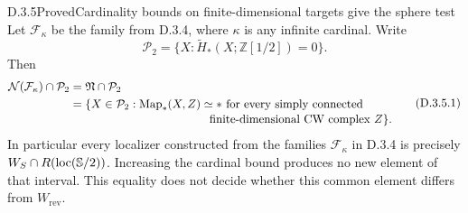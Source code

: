 \begin{claim}{D.3.5}{Proved}{Cardinality bounds on finite-dimensional targets give the sphere test}
Let $\mathcal F_\kappa$ be the family from D.3.4, where
$\kappa$ is any infinite cardinal. Write
\[
 \mathcal P_2=\{X:\widetilde H_*(X;\mathbb Z[1/2])=0\}.
\]
Then
\[
 \begin{aligned}
 \mathcal N(\mathcal F_\kappa)\cap\mathcal P_2
   &=\Nul\cap\mathcal P_2\\
   &=\{X\in\mathcal P_2:
       \Map_*(X,Z)\simeq *\text{ for every simply connected}\\[-2pt]
   &\hspace{42mm}\text{finite-dimensional CW complex }Z\}.
 \end{aligned}
 \tag{D.3.5.1}
\]
In particular every localizer constructed from the families
$\mathcal F_\kappa$ in D.3.4 is precisely
$W_S\cap R(\operatorname{loc}(\mathbb S/2))$.
Increasing the cardinal bound produces no new element of that
interval. This equality does not decide whether this common
element differs from $W_{\mathrm{rev}}$.
\end{claim}
